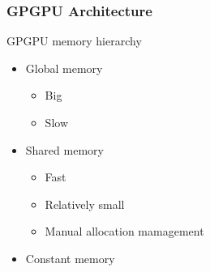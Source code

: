 \documentclass[xcolor=table]{beamer}
\begin{document}
\begin{frame} \frametitle{GPGPU Architecture}
  \begin{minipage}[m]{0.4\linewidth}
  \end{minipage}\hfill
  \begin{minipage}[m]{0.55\linewidth}
  GPGPU memory hierarchy
  \pause
  \begin{itemize}
        \item Global memory
        \begin{itemize}
          \item[\faSmileO] Big
          \item[\faFrownO] Slow
        \end{itemize}
        \pause
        \item Shared memory
          \begin{itemize}
            \item[\faSmileO] Fast
            \item[\faFrownO] Relatively small
            \item[\faFrownO] Manual allocation mamagement
          \end{itemize}
          \pause
          \item Constant memory

\end{itemize}
\end{minipage}
\end{frame}
\end{document}

